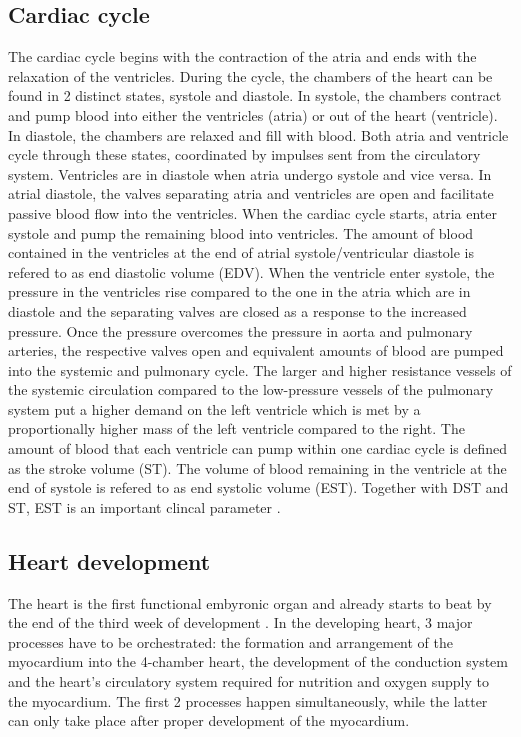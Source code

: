 \subsection{Cardiac cycle}
The cardiac cycle begins with the contraction of the atria and ends with the relaxation of the ventricles. During the cycle, the chambers of the heart can be found in \num{2} distinct states, systole and diastole. In systole, the chambers contract and pump blood into either the ventricles (atria) or out of the heart (ventricle). In diastole, the chambers are relaxed and fill with blood. Both atria and ventricle cycle through these states, coordinated by impulses sent from the circulatory system.  Ventricles are in diastole when atria undergo systole and vice versa. In atrial diastole, the valves separating atria and ventricles are open and facilitate passive blood flow into the ventricles. When the cardiac cycle starts, atria enter systole and pump the remaining blood into ventricles.  The amount of blood contained in the ventricles at the end of atrial systole/ventricular diastole is refered to as end diastolic volume (EDV). When the ventricle enter systole, the pressure in the ventricles rise compared to the one in the atria which are in diastole and the separating valves are closed as a response to the increased pressure. Once the pressure overcomes the pressure in aorta and pulmonary arteries, the respective valves open and equivalent amounts of blood are pumped into the systemic and pulmonary cycle. The larger and higher resistance vessels of the systemic circulation compared to the low-pressure vessels of the pulmonary system put a higher demand on the left ventricle which is met by a proportionally higher mass of the left ventricle compared to the right. The amount of blood that each ventricle can pump within one cardiac cycle is defined as the stroke volume (ST). The volume of blood remaining in the ventricle at the end of systole is refered to as end systolic volume (EST). Together with DST and ST, EST is an important clincal parameter \citep{Betts2013}. 

\subsection{Heart development}
\label{section:heart-development}
The heart is the first functional embyronic organ and already starts to beat by the end of the third week of development \citep{Zambrano2002}. In the developing heart, \num{3} major processes have to be orchestrated: the formation and arrangement of the myocardium into the \num{4}-chamber heart, the development of the conduction system and the heart's circulatory system required for nutrition and oxygen supply to the myocardium. The first \num{2} processes happen simultaneously, while the latter can only take place after proper development of the myocardium. 

